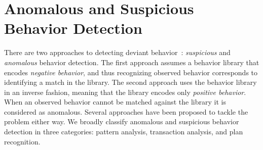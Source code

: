 

%
%
\section{Anomalous and Suspicious Behavior Detection}

 There are two approaches to detecting deviant behavior~\citep{Avrahami-Zilberbrand2009}: \emph{suspicious} and \emph{anomalous} behavior detection. The first approach assumes a behavior library that encodes \emph{negative behavior}, and thus recognizing observed behavior corresponds to identifying a match in the library. The second approach uses the behavior library in an inverse fashion, meaning that the library encodes only \emph{positive behavior}. When an observed behavior cannot be matched against the library it is considered as anomalous. Several approaches have been proposed to tackle the problem either way. We broadly classify anomalous and suspicious behavior detection in three categories: pattern analysis, transaction analysis, and plan recognition.

